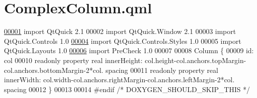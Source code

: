 \hypertarget{ComplexColumn_8qml}{\section{Complex\-Column.\-qml}
\label{ComplexColumn_8qml}
}

\begin{DoxyCode}
\hypertarget{ComplexColumn_8qml_source_l00001}{}\hyperlink{classComplexColumn}{00001} \textcolor{keyword}{import} QtQuick 2.1
00002 import QtQuick.Window 2.1
00003 import QtQuick.Controls 1.0
\hypertarget{ComplexColumn_8qml_source_l00004}{}\hyperlink{classComplexColumn_a8ed7398e27678a9b93bb33f37d6b3836}{00004} import QtQuick.Controls.Styles 1.0
00005 import QtQuick.Layouts 1.0
\hypertarget{ComplexColumn_8qml_source_l00006}{}\hyperlink{classComplexColumn_a76206dc1264db4c7af6ed5b7a87a58aa}{00006} import PreCheck 1.0
00007 
00008 Column \{
00009     \textcolor{keywordtype}{id}: col
00010     readonly \textcolor{keyword}{property} real innerHeight: col.height-col.anchors.topMargin-col.anchors.bottomMargin-2*col.
      spacing
00011     readonly \textcolor{keyword}{property} real innerWidth: col.width-col.anchors.rightMargin-col.anchors.leftMargin-2*col.
      spacing
00012 \}
00013 
00014 \textcolor{preprocessor}{#endif }\textcolor{comment}{/* DOXYGEN\_SHOULD\_SKIP\_THIS */}\textcolor{preprocessor}{}
\end{DoxyCode}
